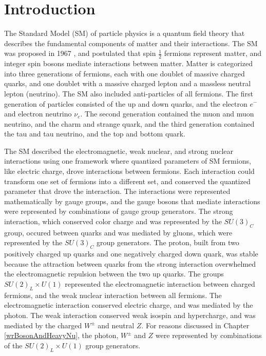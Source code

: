 \chapter{Introduction}
\label{intro_chapter}
The Standard Model (SM) of particle physics is a quantum field theory that describes the fundamental 
components of matter and their interactions.  The SM was proposed in 
1967 \cite{weinbergSM,salamSM}, and postulated that spin $\frac{1}{2}$ fermions represent matter, and 
integer spin bosons mediate interactions between matter.  Matter is categorized into three generations 
of fermions, each with one doublet of massive charged quarks, and one doublet with a massive charged 
lepton and a massless neutral lepton (neutrino).  The SM also included anti-particles of all fermions.  
The first generation of particles consisted of the up and down quarks, and the electron $e^{-}$ and electron neutrino $\nu_{e}$.  
The second generation contained the muon and muon neutrino, and the charm and strange quark, and the 
third generation contained the tau and tau neutrino, and the top and bottom quark.

The SM described the electromagnetic, weak nuclear, and strong nuclear interactions using one framework 
where quantized parameters of SM fermions, like electric charge, drove interactions between fermions.  
Each interaction could transform one set of fermions into a different set, and conserved the quantized 
parameter that drove the interaction.  The interactions were represented mathematically by gauge groups, and the 
gauge bosons that mediate interactions were represented by combinations of gauge group 
generators.  The strong interaction, which conserved color charge and was represented by the $SU(3)_{C}$ 
group, occured between quarks and was mediated by gluons, which were represented by the $SU(3)_{C}$ group 
generators.  The proton, built from two positively charged up quarks and one negatively charged down 
quark, was stable because the attraction between quarks from the strong interaction overwhelmed the 
electromagnetic repulsion between the two up quarks.  The groups $SU(2)_{L} \times U(1)$ represented the 
electromagnetic interaction between charged fermions, and the weak nuclear interaction between all fermions.  
The electromagnetic interaction conserved electric charge, and was mediated by the photon.  The weak 
interaction conserved weak isospin and hypercharge, and was mediated by the charged $W^{\pm}$ and neutral 
$Z$.  For reasons discussed in Chapter \ref{wrBosonAndHeavyNu}, the photon, $W^{\pm}$ and $Z$ were 
represented by combinations of the $SU(2)_{L} \times U(1)$ group generators.

